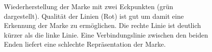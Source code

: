 \begin{figure}[!ht]
	\centering
	\caption{Wiederherstellung der Marke mit zwei Eckpunkten (grün dargestellt).
	  Qualität der Linien (Rot) ist gut um damit eine Erkennung der Marke zu
	 ermöglichen.  Die rechte Linie ist deutlich kürzer als die linke Linie. Eine
	 Verbindungslinie zwischen den beiden Enden liefert eine schlechte Repräsentation der Marke.}
	\label{fig:quadrangledetection}
\end{figure}


\begin{comment}
	Der RANSAC Grouper wird verwendet um gerade Liniensegmente zu finden. Dazu werden zwei zufällige edgels ausgewählt
	 und ihre kompatible Orientierung überprüft. Die Anzahl der supporting edgels wird durch die Distanz des
	 Liniensegments und der Orientierung bestimmt. Durch wiederholung dieses Prozesses wird die dominante Linie in der
	 Region bestimmt. Die supporting edgels werden entfernt und der Prozess wird wiederholt bis keine edgels mehr
	 vorhanden sind oder eine maximale Anzahl von wiederholungen erreicht wurde. Durch dieses Wiederholung wird
	 sichergestellt, dass alle dominanten Linien in einer Region erkannt werden.

	Vorteil: Der Algorithmus ist sehr schnell und lässt sich für gewünschte Liniensegmente anpassen.
	Nachteil: Durch sein antisotropic detection verhalten diskriminiert das verfahren diagonale liniensegmente. Dies
	 ist durch ein rechteckiges samplingrid bedingt.

	Hirzer hat das Verfahren um zwei Punkte erweitert und angepasst.
	Wird in einem RGB Bild ein Kanal untersucht und ein Edgel gefunden, werden in den restlichen zwei Kanälen an der
	 gleichen Position nach einem Edgel gesucht. Falls in allen drei Kanälen ein Edgel gefunden wird, handelt es sich
	 um ein Linie (Schwarz/Weiß) und keine Farblinie.

	Nur das erste Frame wird vollständig untersucht und die Position der gefundenen Marken notiert. In den folgenden
	 frames wird nur in den Regionen der gefundenen Marke das Verfahren benutzt. Erst nach einer festgelegten Anzahl
	 von frames wird wieder ein vollständiger Durchlauf des Verfahrens durchgeführt.
\end{comment}


